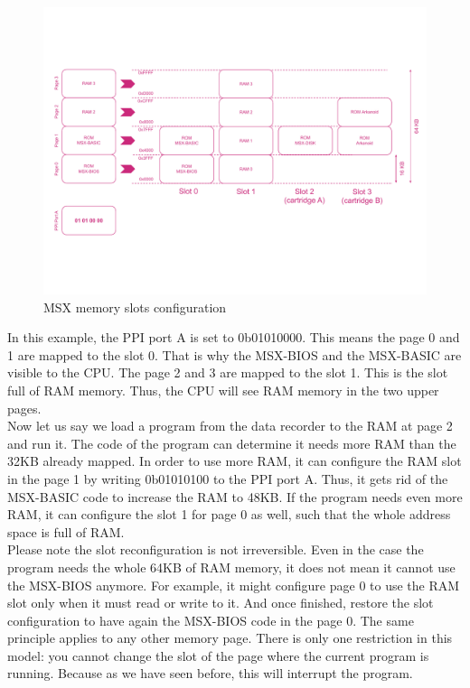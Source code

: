 \begin{figure}
	\centering
	\includegraphics[width=1\linewidth,trim={0cm 100 0 80}]{images/figures/msx-mem-slotsprim}
	\caption{MSX memory slots configuration}
	\label{fig:msx-mem-slotsprim}
\end{figure}

In this example, the PPI port A is set to 0b01010000. This means the page 0 and 1 are mapped to the slot 0. That is why the MSX-BIOS and the MSX-BASIC are visible to the CPU. The page 2 and 3 are mapped to the slot 1. This is the slot full of RAM memory. Thus, the CPU will see RAM memory in the two upper pages. \\

Now let us say we load a program from the data recorder to the RAM at page 2 and run it. The code of the program can determine it needs more RAM than the 32KB already mapped. In order to use more RAM, it can configure the RAM slot in the page 1 by writing 0b01010100 to the PPI port A. Thus, it gets rid of the MSX-BASIC code to increase the RAM to 48KB. If the program needs even more RAM, it can configure the slot 1 for page 0 as well, such that the whole address space is full of RAM. \\

Please note the slot reconfiguration is not irreversible. Even in the case the program needs the whole 64KB of RAM memory, it does not mean it cannot use the MSX-BIOS anymore. For example, it might configure page 0 to use the RAM slot only when it must read or write to it. And once finished, restore the slot configuration to have again the MSX-BIOS code in the page 0. The same principle applies to any other memory page. There is only one restriction in this model: you cannot change the slot of the page where the current program is running. Because as we have seen before, this will interrupt the program. \\


